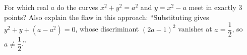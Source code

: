 For which real $a$ do the curves $x^2+y^2=a^2$ and $y=x^2-a$ meet in exactly $3$ points? Also explain the flaw in this approach: ``Substituting gives $y^2+y+(a-a^2)=0$, whose discriminant $(2a-1)^2$ vanishes at $a=\dfrac12$, so $a\ne\dfrac12$.''
